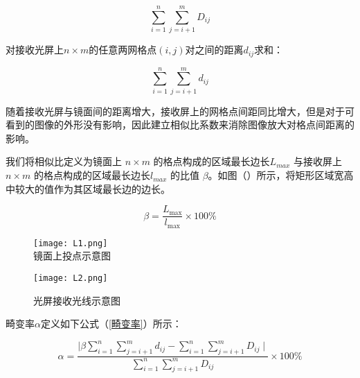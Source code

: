 \documentclass[withoutpreface,bwprint]{cumcmthesis} %
\begin{document}
\begin{equation}
	\sum\limits_{i = 1}^{n}\sum\limits_{j = i + 1}^{m} D_{ij}
\end{equation} 

\par 对接收光屏上$n \times m$的任意两网格点$(i,j)$对之间的距离$d_{ij}$求和：

\begin{equation}
	\sum\limits_{i = 1}^{n}\sum\limits_{j = i + 1}^{m} d_{ij}
\end{equation}

\par 随着接收光屏与镜面间的距离增大，接收屏上的网格点间距同比增大，但是对于可看到的图像的外形没有影响，因此建立相似比系数来消除图像放大对格点间距离的影响。
\par 我们将相似比定义为镜面上 $n \times m$ 的格点构成的区域最长边长$L_{max}$ 与接收屏上 $n \times m$ 的格点构成的区域最长边长$l_{max}$ 的比值 $\beta$。如图（）所示，将矩形区域宽高中较大的值作为其区域最长边的边长。

\begin{equation}
	\beta = \frac{L_{\mathop{max}}}{l_{\mathop{max}}} \times 100 \%
\end{equation}



\begin{figure}[!htbp]  
\begin{minipage}[t]{0.5\textwidth}
\centering  
\texttt{[image: L1.png]} \\
\caption{镜面上投点示意图} \label{L1}
\end{minipage}
\hspace{1ex}
\begin{minipage}[t]{0.5\textwidth}  
\centering  
\texttt{[image: L2.png]}\\
\caption{光屏接收光线示意图}  \label{L2}
\end{minipage}  
\end{figure} 


\par 畸变率$\alpha$定义如下公式（\ref{畸变率}）所示：


\begin{equation}
\label{畸变率}
	\alpha = \frac{\mid \beta \sum\limits_{i = 1}^{n}\sum\limits_{j = i + 1}^{m} d_{ij} - \sum\limits_{i = 1}^{n}\sum\limits_{j = i + 1}^{m} D_{ij} \mid}{\sum\limits_{i = 1}^{n}\sum\limits_{j = i + 1}^{m} D_{ij}} \times 100 \%
\end{equation}
\end{document}
